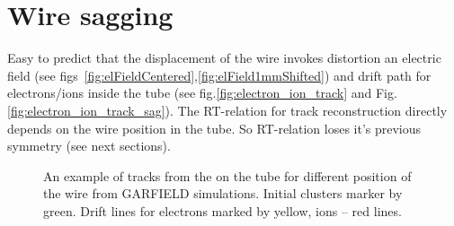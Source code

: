 \section{Wire sagging}

	Easy to predict that the displacement of the wire invokes distortion an electric field (see figs~\ref{fig:elFieldCentered},\ref{fig:elField1mmShifted}) and drift path for electrons/ions inside the tube (see fig.\ref{fig:electron_ion_track} and Fig.\ref{fig:electron_ion_track_sag}). The RT-relation for track reconstruction directly depends on the wire position in the tube. So RT-relation loses it's previous symmetry (see next sections).
	
	\begin{figure}[h!]
		\centering
		\qquad
		\caption{ An example of tracks from the on the tube for different position of the wire from GARFIELD simulations. Initial clusters marker by green. Drift lines for electrons marked by yellow, ions -- red lines.}	
	\end{figure}
	
